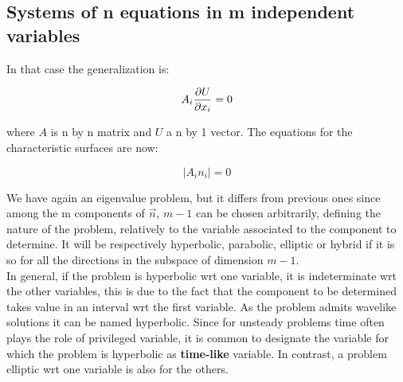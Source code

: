 \subsection{Systems of n equations in m independent variables}
In that case the generalization is: 

\begin{equation}
A_i \frac{\partial U}{\partial x_i} = 0
\end{equation}

where $A$ is n by n matrix and $U$ a n by 1 vector. The equations for the characteristic surfaces are now: 

\begin{equation}
|A_i n_i| = 0
\end{equation}

We have again an eigenvalue problem, but it differs from previous ones since among the m components of $\vec{n}$, $m-1$ can be chosen arbitrarily, defining the nature of the problem, relatively to the variable associated to the component to determine. It will be respectively hyperbolic, parabolic, elliptic or hybrid if it is so for all the directions in the subspace of dimension $m-1$. \\

In general, if the problem is hyperbolic wrt one variable, it is indeterminate wrt the other variables, this is due to the fact that the component to be determined takes value in an interval wrt the first variable. As the problem admits wavelike solutions it can be named hyperbolic. Since for unsteady problems time often plays the role of privileged variable, it is common to designate the variable for which the problem is hyperbolic as \textbf{time-like} variable. In contrast, a problem elliptic wrt one variable is also for the others. 

